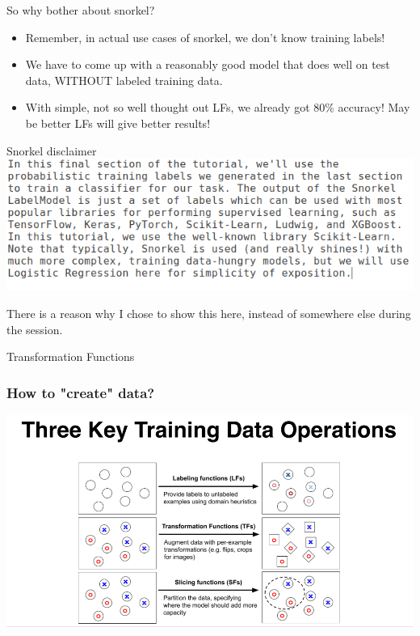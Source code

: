 \documentclass{beamer}
\begin{document}
\begin{frame}{So why bother about snorkel?}
    \begin{itemize}
        \item Remember, in actual use cases of snorkel, we don't know training labels!
        \item We have to come up with a reasonably good model that does well on test data, WITHOUT labeled training data.
        \item With simple, not so well thought out LFs, we already got 80\% accuracy! May be better LFs will give better results!
    \end{itemize}
\end{frame}

\begin{frame}{Snorkel disclaimer}
        \includegraphics[width=\textwidth]{figures/noteonsnorkel.png}
        
        There is a reason why I chose to show this here, instead of somewhere else during the session. 

\end{frame}

\begin{frame}{}
    \Large Transformation Functions
\end{frame}

\begin{frame}
\frametitle{How to "create" data?}
    \includegraphics[width=\textwidth]{figures/3snorkelops.PNG}
\end{frame}
\end{document}
